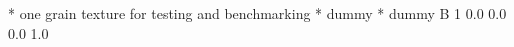 * one grain texture for testing and benchmarking
* dummy
* dummy
B    1
   0.0    0.0    0.0      1.0

